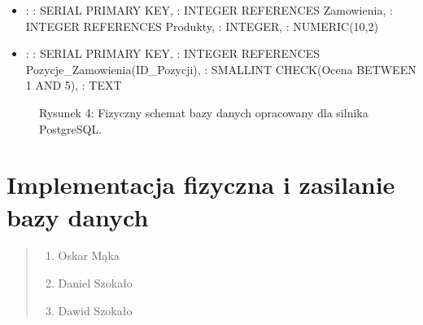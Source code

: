 \documentclass[letterpaper,10pt,polish]{sphinxmanual}
\begin{document}
\begin{itemize}
\item {} 
\sphinxAtStartPar
{}:  : SERIAL PRIMARY KEY,  : INTEGER REFERENCES Zamowienia,  : INTEGER REFERENCES Produkty,  : INTEGER,  : NUMERIC(10,2)

\item {} 
\sphinxAtStartPar
{}:  : SERIAL PRIMARY KEY,  : INTEGER REFERENCES Pozycje\_Zamowienia(ID\_Pozycji),  : SMALLINT CHECK(Ocena BETWEEN 1 AND 5),  : TEXT

\end{itemize}

\begin{figure}[htbp]
\centering
\capstart

\noindent{}
\caption{Rysunek 4: Fizyczny schemat bazy danych opracowany dla silnika PostgreSQL.}\label{\detokenize{rozdzia_u0142_3/BD_PlanBazyDanych_zad1/index:id4}}\end{figure}

\sphinxstepscope

\sphinxstepscope


\chapter{Implementacja fizyczna i zasilanie bazy danych}
\label{\detokenize{rozdzia_u0142_4/BD_WprowadzanieBD/index:implementacja-fizyczna-i-zasilanie-bazy-danych}}\label{\detokenize{rozdzia_u0142_4/BD_WprowadzanieBD/index::doc}}\label{\detokenize{rozdzia_u0142_4/BD_WprowadzanieBD/index::doc}}\begin{quote}\begin{description}
\begin{enumerate}
%
\item {} 
\sphinxAtStartPar
Oskar Mąka

\item {} 
\sphinxAtStartPar
Daniel Szokało

\item {} 
\sphinxAtStartPar
Dawid Szokało

\end{enumerate}

\end{description}\end{quote}
\end{document}
